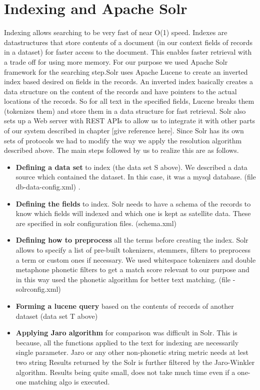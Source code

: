 \section{Indexing and Apache Solr}
        Indexing allows searching to be very fast of near O(1) speed. Indexes are datastructures that store contents of a document (in our context fields of records in a dataset) for faster access to the document. This enables faster retrieval with a trade off for using more memory. For our purpose we used Apache Solr framework for the searching step.Solr uses Apache Lucene to create an inverted index based desired on fields in the records. An inverted index basically creates a data structure on the content of the records and have pointers to the actual locations of the records. So for all text in the specified fields, Lucene breaks them (tokenizes them) and store them in a data structure for fast retrieval.  Solr also sets up a  Web server with REST APIs to allow us to integrate it with other parts of our system described in chapter [give reference here]. 
        Since Solr has its own sets of protocols we had to modify the way we apply the resolution algorithm described above. The main steps followed by us to realize this are as follows. 
\begin{itemize}

        \item \textbf{ Defining a data set } to index  (the data set S above). We described a data source which contained the dataset. In this case, it was a mysql database. (file db-data-config.xml) .
        \item \textbf{ Defining the fields } to index. Solr needs to have a schema of the records to know which fields will indexed and which one is kept as satellite data. These are specified in solr configuration files. (schema.xml)
        \item \textbf{ Defining how to preprocess } all the terms before creating the index. Solr allows to specify a list of pre-built tokenizers, stemmers, filters to preprocess a term or custom ones if necessary. We used whitespace tokenizers and double metaphone phonetic filters to get a match score relevant to our purpose and in this way used the phonetic algorithm for better text matching. (file - solrconfig.xml)
        \item \textbf{ Forming a lucene query } based on the contents of records of another dataset (data set T above)
        \item \textbf{ Applying Jaro algorithm } for comparison was difficult in Solr. This is because, all the functions applied to the text for indexing are necessarily single parameter. Jaro or any other non-phonetic string metric needs at lest two string Results returned by the Solr is further filtered by the Jaro-Winkler algorithm. Results being quite small, does not take much time even if a one-one matching algo is executed. 

\end{itemize}
